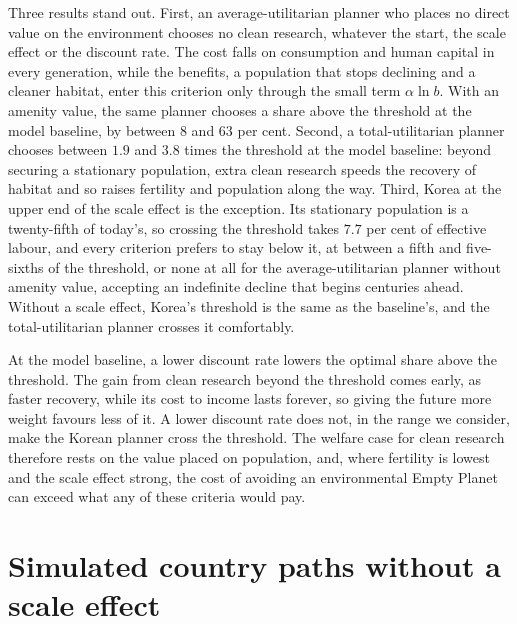 \documentclass[11pt]{article}
\begin{document}
Three results stand out. First, an average-utilitarian planner who places no direct value on the
environment chooses no clean research, whatever the start, the scale effect or the discount rate. The
cost falls on consumption and human capital in every generation, while the benefits, a population that
stops declining and a cleaner habitat, enter this criterion only through the small term $\alpha\ln b$.
With an amenity value, the same planner chooses a share above the threshold at the model baseline, by
between 8 and 63 per cent. Second, a total-utilitarian planner chooses between $1.9$ and $3.8$ times the
threshold at the model baseline: beyond securing a stationary population, extra clean research speeds the recovery of
habitat and so raises fertility and population along the way. Third, Korea at the upper end of the scale
effect is the exception. Its stationary population is a twenty-fifth of today's, so crossing the threshold
takes $7.7$ per cent of effective labour, and every criterion prefers to stay below it, at between a
fifth and five-sixths of the threshold, or none at all for the average-utilitarian planner without
amenity value, accepting an indefinite decline that begins centuries ahead.
Without a scale effect, Korea's threshold is the same as the baseline's, and the total-utilitarian
planner crosses it comfortably.

At the model baseline, a lower discount rate lowers the optimal share above the threshold. The gain from clean research beyond
the threshold comes early, as faster recovery, while its cost to income lasts forever, so giving the
future more weight favours less of it. A lower discount rate does not, in the range we consider, make the
Korean planner cross the threshold. The welfare case for clean research therefore rests on the value
placed on population, and, where fertility is lowest and the scale effect strong, the cost of avoiding
an environmental Empty Planet can exceed what any of these criteria would pay.

\clearpage
\section{Simulated country paths without a scale effect}
\label{app:paths}
\setcounter{table}{0}
\end{document}
